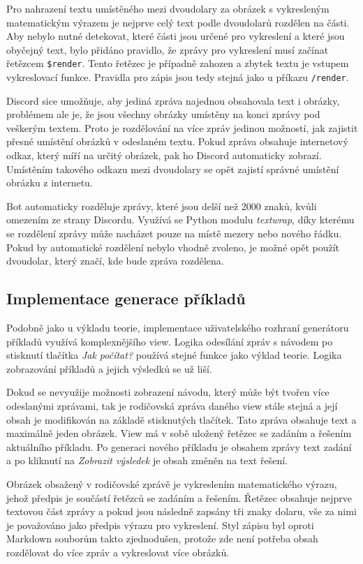 \documentclass[FM]{tulthesis}
\begin{document}
	Pro nahrazení textu umístěného mezi dvoudolary za obrázek s vykresleným matematickým výrazem je nejprve celý text podle dvoudolarů rozdělen na části. Aby nebylo nutné detekovat, které části jsou určené pro vykreslení a které jsou obyčejný text, bylo přidáno pravidlo, že zprávy pro vykreslení musí začínat řetězcem \verb|$render|. Tento řetězec je případně zahozen a zbytek textu je vstupem vykreslovací funkce. Pravidla pro zápis jsou tedy stejná jako u příkazu \verb|/render|.
	
	Discord sice umožňuje, aby jediná zpráva najednou obsahovala text i obrázky, problémem ale je, že jsou všechny obrázky umístěny na konci zprávy pod veškerým textem. Proto je rozdělování na více zpráv jedinou možností, jak zajistit přesné umístění obrázků v odeslaném textu. Pokud zpráva obsahuje internetový odkaz, který míří na určitý obrázek, pak ho Discord automaticky zobrazí. Umístěním takového odkazu mezi dvoudolary se opět zajistí správné umístění obrázku z internetu.
	
	Bot automaticky rozděluje zprávy, které jsou delší než 2000 znaků, kvůli omezením ze strany Discordu. Využívá se Python modulu \textit{textwrap}, díky kterému se rozdělení zprávy může nacházet pouze na místě mezery nebo nového řádku. Pokud by automatické rozdělení nebylo vhodně zvoleno, je možné opět použít dvoudolar, který značí, kde bude zpráva rozdělena.
	
	\subsection{Implementace generace příkladů}
	
	Podobně jako u výkladu teorie, implementace uživatelského rozhraní generátoru příkladů využívá komplexnějšího view. Logika odesílání zpráv s návodem po stisknutí tlačítka \textit{Jak počítat?} používá stejné funkce jako výklad teorie. Logika zobrazování příkladů a jejich výsledků se už liší.
	
	Dokud se nevyužije možnosti zobrazení návodu, který může být tvořen více odeslanými zprávami, tak je rodičovská zpráva daného view stále stejná a její obsah je modifikován na základě stisknutých tlačítek. Tato zpráva obsahuje text a maximálně jeden obrázek. View má v sobě uložený řetězec se zadáním a řešením aktuálního příkladu. Po generaci nového příkladu je obsahem zprávy text zadání a po kliknutí na \textit{Zobrazit výsledek} je obsah změněn na text řešení.
	
	Obrázek obsažený v rodičovské zprávě je vykreslením matematického výrazu, jehož předpis je součástí řetězců se zadáním a řešením. Řetězec obsahuje nejprve textovou část zprávy a pokud jsou následně zapsány tři znaky dolaru, vše za nimi je považováno jako předpis výrazu pro vykreslení. Styl zápisu byl oproti \mbox{Markdown} souborům takto zjednodušen, protože zde není potřeba obsah rozdělovat do více zpráv a vykreslovat více obrázků.
	
\end{document}

